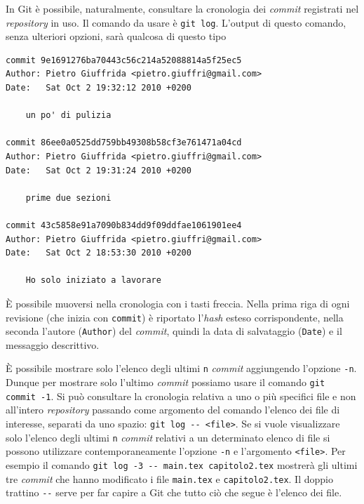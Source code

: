 \documentclass[a4paper,12pt,oneside]{article}
\begin{document}
In Git è possibile, naturalmente, consultare la cronologia dei \emph{commit}
registrati nel \emph{repository} in uso. Il comando da usare è
\lstinline|git log|. L'output di questo comando, senza ulteriori opzioni, sarà
qualcosa di questo tipo
\begin{lstlisting}
commit 9e1691276ba70443c56c214a52088814a5f25ec5
Author: Pietro Giuffrida <pietro.giuffri@gmail.com>
Date:   Sat Oct 2 19:32:12 2010 +0200

    un po' di pulizia

commit 86ee0a0525dd759bb49308b58cf3e761471a04cd
Author: Pietro Giuffrida <pietro.giuffri@gmail.com>
Date:   Sat Oct 2 19:31:24 2010 +0200

    prime due sezioni

commit 43c5858e91a7090b834dd9f09ddfae1061901ee4
Author: Pietro Giuffrida <pietro.giuffri@gmail.com>
Date:   Sat Oct 2 18:53:30 2010 +0200

    Ho solo iniziato a lavorare
\end{lstlisting}
È possibile muoversi nella cronologia con i tasti freccia. Nella prima riga di
ogni revisione (che inizia con \lstinline|commit|) è riportato l'\emph{hash}
esteso corrispondente, nella seconda l'autore (\lstinline|Author|) del
\emph{commit}, quindi la data di salvataggio (\lstinline|Date|) e il messaggio
descrittivo.

È possibile mostrare solo l'elenco degli ultimi \lstinline|n| \emph{commit}
aggiungendo l'opzione \lstinline|-n|. Dunque per mostrare solo l'ultimo
\emph{commit} possiamo usare il comando \lstinline|git commit -1|. Si può
consultare la cronologia relativa a uno o più specifici file e non all'intero
\emph{repository} passando come argomento del comando l'elenco dei file di
interesse, separati da uno spazio: \lstinline|git log -- <file>|. Se si vuole
visualizzare solo l'elenco degli ultimi \lstinline|n| \emph{commit} relativi a
un determinato elenco di file si possono utilizzare contemporaneamente l'opzione
\lstinline|-n| e l'argomento \lstinline|<file>|. Per esempio il comando
\lstinline|git log -3 -- main.tex capitolo2.tex| mostrerà gli ultimi tre
\emph{commit} che hanno modificato i file \lstinline|main.tex| e
\lstinline|capitolo2.tex|. Il doppio trattino \lstinline|--| serve per far
capire a Git che tutto ciò che segue è l'elenco dei file.
\end{document}
